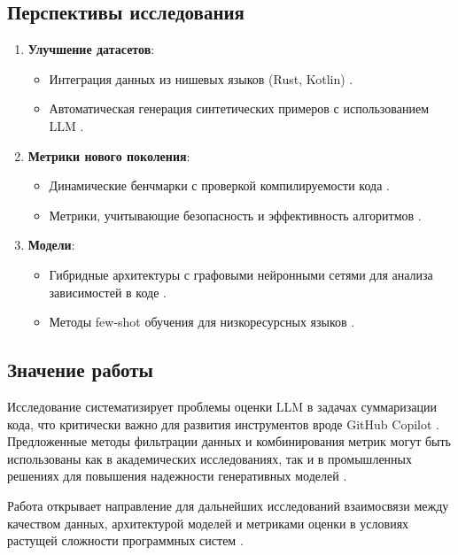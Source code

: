 \documentclass[14pt]{article}
\theoremstyle{definition}
\begin{document}
\subsection{Перспективы исследования}
\begin{enumerate}
    \item \textbf{Улучшение датасетов}:
    \begin{itemize}
        \item Интеграция данных из нишевых языков (Rust, Kotlin) \cite{zhu2022}.
        \item Автоматическая генерация синтетических примеров с использованием LLM \cite{austin2021program}.
    \end{itemize}
    \item \textbf{Метрики нового поколения}:
    \begin{itemize}
        \item Динамические бенчмарки с проверкой компилируемости кода \cite{zhou2022devign}.
        \item Метрики, учитывающие безопасность и эффективность алгоритмов \cite{copilot, zhou2022devign}.
    \end{itemize}
    \item \textbf{Модели}:
    \begin{itemize}
        \item Гибридные архитектуры с графовыми нейронными сетями для анализа зависимостей в коде \cite{guo2021graphcodebert}.
        \item Методы few-shot обучения для низкоресурсных языков \cite{hu2022lora}.
    \end{itemize}
\end{enumerate}

\subsection{Значение работы}
Исследование систематизирует проблемы оценки LLM в задачах суммаризации кода, что критически важно для развития инструментов вроде GitHub Copilot \cite{copilot}. Предложенные методы фильтрации данных и комбинирования метрик могут быть использованы как в академических исследованиях, так и в промышленных решениях для повышения надежности генеративных моделей \cite{wan2023codet5+, zhang2020retrieval}.

Работа открывает направление для дальнейших исследований взаимосвязи между качеством данных, архитектурой моделей и метриками оценки в условиях растущей сложности программных систем \cite{liu2022survey, zaheer2020bigbird}.
\end{document}
